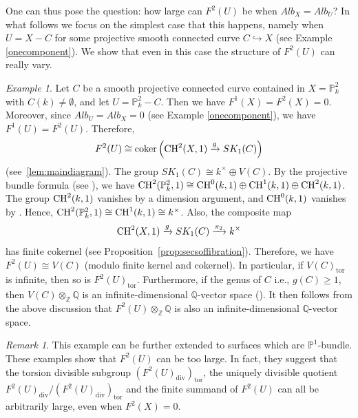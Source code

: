 \documentclass[12pt]{amsart}
\theoremstyle{remark}
\newtheorem{rem}[rem]{Remark}
\newtheorem{exm}[thm]{Example}
\renewcommand{\1}{{\mathbb{S}}}
\newcommand{\CH}{{\rm CH}}
\newcommand{\<}{\langle}
\renewcommand{\>}{\rangle}
\begin{document}
    One can thus pose the question: how large can $F^2(U)$ be when $Alb_X=Alb_U$? In what follows we focus on the simplest case that this happens, namely when $U=X-C$ for some projective smooth connected curve $C\hookrightarrow X$ (see Example \ref{onecomponent}). We show that even in this case the structure of $F^2(U)$ can really vary.   

\begin{exm}\label{P2 example}
 Let \( C \) be a smooth projective connected curve contained in \( X = \mathbb{P}^2_k \) with \( C(k) \neq \emptyset \), and let \( U = \mathbb{P}^2_k - C \). Then we have \( F^{1}(X) = F^{2}(X) = 0 \). Moreover, since \( Alb_{U}=Alb_X=0 \) (see Example \ref{onecomponent}), we have \( F^{1}(U) = F^{2}(U) \). Therefore,
\[
F^{2}(U) \cong \operatorname{coker} \left( \CH^{2}(X,1) \xrightarrow{g} SK_{1}(C) \right)
\]
(see~\autoref{lem:maindiagram}). The group \( SK_{1}(C) \cong k^{\times} \oplus V(C) \). By the projective bundle formula (see \cite{Bl2}), we have $\CH^{2}(\mathbb{P}^2_k, 1) \cong \CH^{0}(k, 1) \oplus \CH^{1}(k, 1) \oplus \CH^{2}(k, 1)$. The group $ \CH^{2}(k, 1)$ vanishes by a dimension argument, and \( \CH^{0}(k, 1) \) vanishes by \cite[Corollary~4.2]{MVW}. Hence,
$\CH^{2}(\mathbb{P}^2_k, 1) \cong \CH^{1}(k, 1) \cong k^{\times}$. Also, the composite map
\[
\CH^{2}(X,1) \xrightarrow{g} SK_{1}(C) \xrightarrow{\pi_{2}} k^{\times}
\]
has finite cokernel (see Proposition~\ref{prop:secsoffibration}). Therefore, we have $F^2(U) \cong V(C)$ (modulo finite kernel and cokernel).
In particular, if \(V(C)_{\mathrm{tor}}\) is infinite, then so is \(F^2(U)_{\mathrm{tor}}\). 
Furthermore, if the genus of \( C \) i.e., $g(C) \geq  1$, then \( V(C) \otimes_{\mathbb{Z}} \mathbb{Q} \) is an infinite-dimensional \( \mathbb{Q} \)-vector space (\cite[Page~210]{Sz}). It then follows from the above discussion that \( F^{2}(U) \otimes_{\mathbb{Z}} \mathbb{Q} \) is also an infinite-dimensional \( \mathbb{Q} \)-vector space. \\ %





\end{exm}
\begin{rem}
 This example can be further extended to surfaces which are $\mathbb{P}^1$-bundle.  These examples show that \(F^2(U)\) can be too large. In fact, they suggest that the torsion divisible subgroup \((F^2(U)_{\mathrm{div}})_{\mathrm{tor}}\), the uniquely divisible quotient $F^2(U)_{\mathrm{div}}/(F^2(U)_{\mathrm{div}})_{\mathrm{tor}}$
 and the finite summand of \(F^2(U)\) can all be arbitrarily large, even when \(F^2(X) = 0\).
\end{rem}
\end{document}
